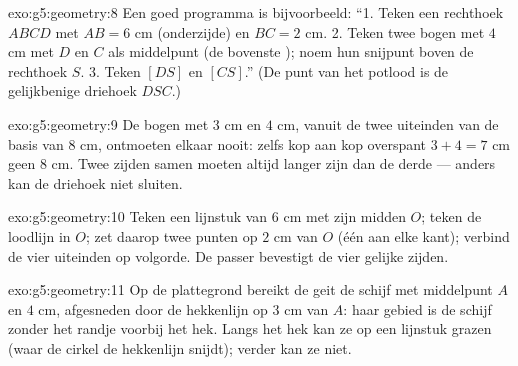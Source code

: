 \begin{solution}{exo:g5:geometry:8}
Een goed programma is bijvoorbeeld: ``1. Teken een rechthoek $ABCD$ met
$AB = 6$ cm (onderzijde) en $BC = 2$ cm. 2. Teken twee bogen met  $4$ cm
met $D$ en $C$ als middelpunt (de bovenste ); noem hun snijpunt
boven de rechthoek $S$. 3. Teken $[DS]$ en $[CS]$.'' (De punt van het potlood
is de gelijkbenige driehoek $DSC$.)
\end{solution}

\begin{solution}{exo:g5:geometry:9}
De bogen met  $3$ cm en $4$ cm, vanuit de twee uiteinden van de basis van
$8$ cm, ontmoeten elkaar nooit: zelfs kop aan kop overspant $3 + 4 = 7$ cm
geen $8$ cm. Twee zijden samen moeten altijd langer zijn dan de derde ---
anders kan de driehoek niet sluiten.
\end{solution}

\begin{solution}{exo:g5:geometry:10}
Teken een lijnstuk van $6$ cm met zijn midden $O$; teken de loodlijn in $O$;
zet daarop twee punten op $2$ cm van $O$ (één aan elke kant); verbind de vier
uiteinden op volgorde. De passer bevestigt de vier gelijke zijden.
\end{solution}

\begin{solution}{exo:g5:geometry:11}
Op de plattegrond bereikt de geit de schijf met middelpunt $A$ en  $4$
cm, afgesneden door de hekkenlijn op $3$ cm van $A$: haar gebied is de schijf
zonder het randje voorbij het hek. Langs het hek kan ze op een lijnstuk grazen
(waar de cirkel de hekkenlijn snijdt); verder kan ze niet.
\end{solution}
